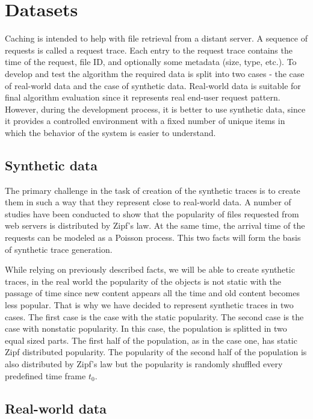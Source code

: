 \section{Datasets} \label{datasets}

Caching is intended to help with file retrieval from a distant server. A sequence of requests is called a request trace. Each entry to the request trace contains the time of the request, file ID, and optionally some metadata (size, type, etc.). To develop and test the algorithm the required data is split into two cases - the case of real-world data and the case of synthetic data. Real-world data is suitable for final algorithm evaluation since it represents real end-user request pattern. However, during the development process, it is better to use synthetic data, since it provides a controlled environment with a fixed number of unique items in which the behavior of the system is easier to understand.

\subsection{Synthetic data} \label{synthetic_data}

The primary challenge in the task of creation of the synthetic traces is to create them in such a way that they represent close to real-world data. A number of studies have been conducted to show that the popularity of files requested from web servers is distributed by Zipf's law\cite{10}. At the same time, the arrival time of the requests can be modeled as a Poisson process\cite{11}. This two facts will form the basis of synthetic trace generation.

While relying on previously described facts, we will be able to create synthetic traces, in the real world the popularity of the objects is not static with the passage of time since new content appears all the time and old content becomes less popular. That is why we have decided to represent synthetic traces in two cases. The first case is the case with the static popularity. The second case is the case with nonstatic popularity. In this case, the population is splitted in two equal sized parts. The first half of the population, as in the case one, has static Zipf distributed popularity. The popularity of the second half of the population is also distributed by Zipf's law but the popularity is randomly shuffled every predefined time frame $ t_0 $.

\subsection{Real-world data} \label{real_data}

